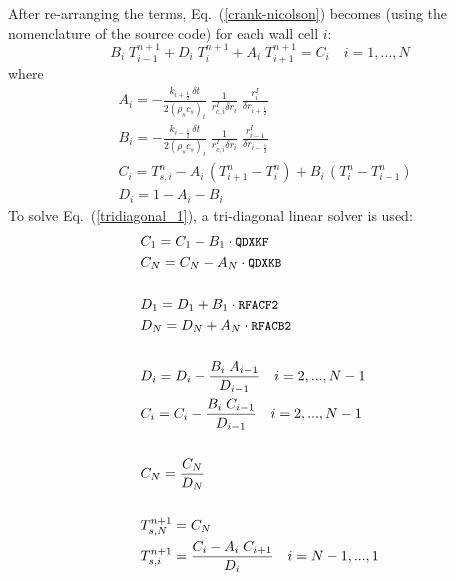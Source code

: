 After re-arranging the terms, Eq.~(\ref{crank-nicolson}) becomes (using the nomenclature of the source code) for each wall cell $i$:
 \begin{equation}
\label{tridiagonal_1}
  B_i \; T_{i-1}^{n+1} + D_i \; T_{i}^{n+1} + A_i \; T_{i+1}^{n+1} = C_i \quad i=1,...,N
\end{equation}
where
\begin{equation}
\label{tridiagonal_2}
\begin{split}
& A_i = -\frac{k_{i+\frac{1}{2}} \, \delta t}{2(\rho_s c_s)_i} \; \frac{1}{r_{c,i}^I \delta r_i} \; \frac{r_{i}^I}{\delta r_{i+\frac{1}{2}}}  \\
& B_i = -\frac{k_{i-\frac{1}{2}} \, \delta t}{2(\rho_s c_s)_i} \; \frac{1}{r_{c,i}^I \delta r_i} \; \frac{r_{i-1}^I}{\delta r_{i-\frac{1}{2}}}   \\
& C_i = T_{s,i}^{n}-A_i \, (T_{i+1}^n-T_i^n) + B_i \, (T_{i}^n-T_{i-1}^n)  \\
& D_i = 1-A_i-B_i
\end{split}
\end{equation}
To solve Eq.~(\ref{tridiagonal_1}), a tri-diagonal linear solver is used:
\begin{equation}
\begin{split}
& C_1 = C_1 - B_1 \cdot \texttt{\small QDXKF} \\
& C_N = C_N - A_N \cdot \texttt{\small QDXKB} \\
& \\
& D_1 = D_1 + B_1 \cdot \texttt{\small RFACF2} \\
& D_N = D_N + A_N \cdot \texttt{\small RFACB2} \\
& \\
& D_i = D_i - \frac{B_i \; A_{i-1}}{D_{i-1}} \quad i = 2, ..., N-1 \\
& C_i = C_i - \frac{B_i \; C_{i-1}}{D_{i-1}} \quad i = 2, ..., N-1\\
& \\
& C_N = \frac{C_N}{D_N} \\
& \\
& T^{n+1}_{s,N} = C_N \\
& T^{n+1}_{s,i} = \frac{C_i - A_i \; C_{i+1}}{D_i} \quad i = N-1,..., 1
\end{split}
\end{equation}
